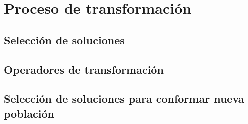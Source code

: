 \section{Proceso de transformación}

\subsection{Selección de soluciones}



\subsection{Operadores de transformación}

\subsection{Selección de soluciones para conformar nueva población}
